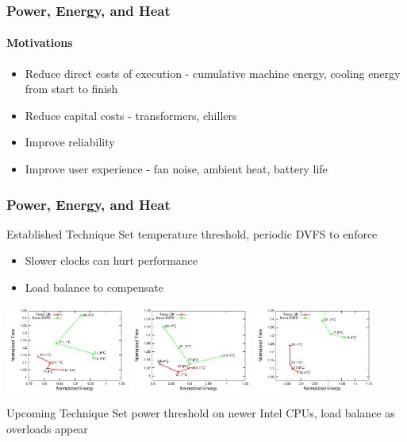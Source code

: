 \begin{frame}
\frametitle{Power, Energy, and Heat}
\framesubtitle{Motivations}
\begin{itemize}
\item Reduce direct costs of execution - cumulative machine energy, cooling energy from start to finish
\item Reduce capital costs - transformers, chillers
\item Improve reliability
\item Improve user experience - fan noise, ambient heat, battery life
\end{itemize}
\end{frame}

\begin{frame}[t]
\frametitle{Power, Energy, and Heat}
\begin{block}{Established Technique}
Set temperature threshold, periodic DVFS to enforce
\end{block}
\begin{itemize}
\item Slower clocks can hurt performance
\item Load balance to compensate
\end{itemize}
\includegraphics[width=0.3\textwidth]{../figures/ft_par.pdf}
\includegraphics[width=0.3\textwidth]{../figures/jacobi_par.pdf}
\includegraphics[width=0.3\textwidth]{../figures/wave_par_bk.pdf}
\pause
\begin{block}{Upcoming Technique}
Set power threshold on newer Intel CPUs, load balance as overloads appear
\end{block}
\end{frame}


